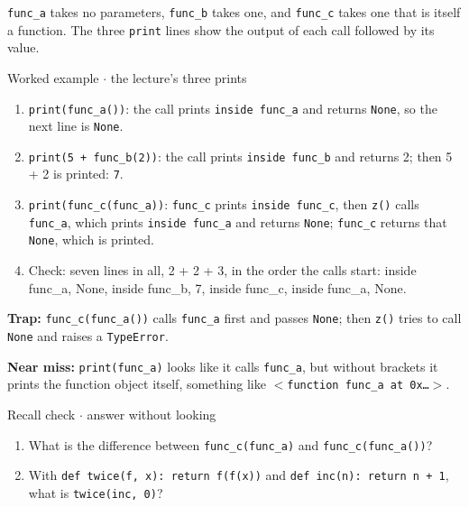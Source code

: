 \documentclass[11pt]{article}
\begin{document}
\begin{keepsection}
\texttt{func\_a} takes no parameters, \texttt{func\_b} takes one, and \texttt{func\_c} takes one that is itself a function. The three \texttt{print} lines show the output of each call followed by its value.

\begin{workedbox}{Worked example \ensuremath{\cdot} the lecture’s three prints}
\begin{enumerate}
\item \texttt{print(func\_a())}: the call prints \texttt{inside func\_a} and returns \texttt{None}, so the next line is \texttt{None}.
\item \texttt{print(5 + func\_b(2))}: the call prints \texttt{inside func\_b} and returns 2; then 5 + 2 is printed: \texttt{7}.
\item \texttt{print(func\_c(func\_a))}: \texttt{func\_c} prints \texttt{inside func\_c}, then \texttt{z()} calls \texttt{func\_a}, which prints \texttt{inside func\_a} and returns \texttt{None}; \texttt{func\_c} returns that \texttt{None}, which is printed.
\item Check: seven lines in all, 2 + 2 + 3, in the order the calls start: inside func\_a, None, inside func\_b, 7, inside func\_c, inside func\_a, None.
\end{enumerate}
\end{workedbox}

\begin{notebox}\textbf{Trap:} \texttt{func\_c(func\_a())} calls \texttt{func\_a} first and passes \texttt{None}; then \texttt{z()} tries to call \texttt{None} and raises a \texttt{TypeError}.\end{notebox}

\begin{notebox}\textbf{Near miss:} \texttt{print(func\_a)} looks like it calls \texttt{func\_a}, but without brackets it prints the function object itself, something like \texttt{\ensuremath{<}function func\_a at 0x…\ensuremath{>}}.\end{notebox}

\begin{recallbox}{Recall check \ensuremath{\cdot} answer without looking}
\begin{enumerate}
\item What is the difference between \texttt{func\_c(func\_a)} and \texttt{func\_c(func\_a())}?
\item With \texttt{def twice(f, x): return f(f(x))} and \texttt{def inc(n): return n + 1}, what is \texttt{twice(inc, 0)}?
\end{enumerate}

\end{recallbox}
\end{keepsection}
\end{document}
